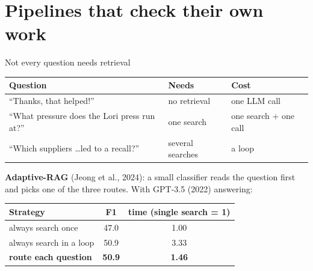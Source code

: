 
\section{Pipelines that check their own work}

\begin{frame}{Not every question needs retrieval}
  \begin{center}
  \footnotesize
  \begin{tabular}{lll}
    \toprule
    \textbf{Question} & \textbf{Needs} & \textbf{Cost} \\
    \midrule
    ``Thanks, that helped!'' & no retrieval & one LLM call \\
    ``What pressure does the Lori press run at?'' & one search & one search + one call \\
    ``Which suppliers \ldots led to a recall?'' & several searches & a loop \\
    \bottomrule
  \end{tabular}
  \end{center}

  \vspace{0.1em}
  {\small \textbf{Adaptive-RAG} (Jeong et al., 2024): a small classifier reads the question first and
  picks one of the three routes. With GPT-3.5 (2022) answering:}

  \vspace{0.1em}
  \begin{center}
  \footnotesize
  \begin{tabular}{lcc}
    \toprule
    \textbf{Strategy} & \textbf{F1} & \textbf{time (single search = 1)} \\
    \midrule
    always search once     & 47.0 & 1.00 \\
    always search in a loop & 50.9 & 3.33 \\
    \textbf{route each question} & \textbf{50.9} & \textbf{1.46} \\
    \bottomrule
  \end{tabular}
  \end{center}

  \vspace{0.1em}
\end{frame}


